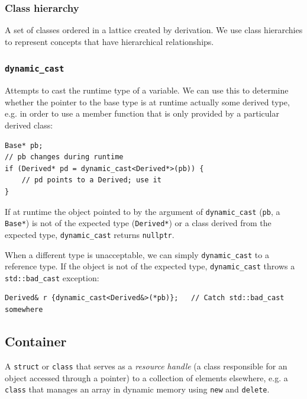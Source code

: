 \documentclass[table, xcdraw]{article}%
\begin{document}
\subsubsection{Class hierarchy}

A set of classes ordered in a lattice created by derivation. We use class hierarchies to represent concepts that have hierarchical relationships.

\subsubsection{\texttt{dynamic_cast}}

Attempts to cast the runtime type of a variable. We can use this to determine whether the pointer to the base type is at runtime actually some derived type, e.g. in order to use a member function that is only provided by a particular derived class:

\begin{verbatim}
Base* pb;
// pb changes during runtime
if (Derived* pd = dynamic_cast<Derived*>(pb)) {
    // pd points to a Derived; use it
}
\end{verbatim}

If at runtime the object pointed to by the argument of \texttt{dynamic_cast} (\texttt{pb}, a \texttt{Base*}) is not of the expected type (\texttt{Derived*}) or a class derived from the expected type, \texttt{dynamic_cast} returns \texttt{nullptr}.

When a different type is unacceptable, we can simply \texttt{dynamic_cast} to a reference type. If the object is not of the expected type, \texttt{dynamic_cast} throws a \texttt{std::bad_cast} exception:

\begin{verbatim}
Derived& r {dynamic_cast<Derived&>(*pb)};   // Catch std::bad_cast somewhere
\end{verbatim}

\subsection{Container}

A \texttt{struct} or \texttt{class} that serves as a \textit{resource handle} (a class responsible for an object accessed through a pointer) to a collection of elements elsewhere, e.g. a \texttt{class} that manages an array in dynamic memory using \texttt{new} and \texttt{delete}.
\end{document}
